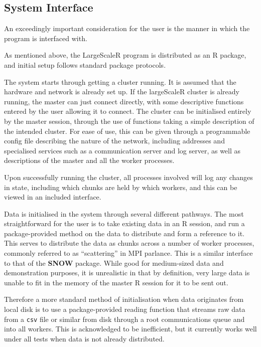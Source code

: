 \subsection{System Interface}

An exceedingly important consideration for the user is the manner in which the program is interfaced with.

As mentioned above, the LargeScaleR program is distributed as an R package, and initial setup follows standard package protocols.

The system starts through getting a cluster running.
It is assumed that the hardware and network is already set up.
If the largeScaleR cluster is already running, the master can just connect directly, with some descriptive functions entered by the user allowing it to connect.
The cluster can be initialised entirely by the master session, through the use of functions taking a simple description of the intended cluster.
For ease of use, this can be given through a programmable config file describing the nature of the network, including addresses and specialised services such as a communication server and log server, as well as descriptions of the master and all the worker processes.

Upon successfully running the cluster, all processes involved will log any changes in state, including which chunks are held by which workers, and this can be viewed in an included interface.

Data is initialised in the system through several different pathways.
The most straightforward for the user is to take existing data in an R session, and run a package-provided method on the data to distribute and form a reference to it.
This serves to distribute the data as chunks across a number of worker processes, commonly referred to as ``scattering'' in MPI parlance.
This is a similar interface to that of the \textbf{SNOW} package.
While good for medium-sized data and demonstration purposes, it is unrealistic in that by definition, very large data is unable to fit in the memory of the master R session for it to be sent out.

Therefore a more standard method of initialisation when data originates from local disk is to use a package-provided reading function that streams raw data from a \texttt{csv} file or similar from disk through a root communications queue and into all workers.
This is acknowledged to be inefficient, but it currently works well under all tests when data is not already distributed.

